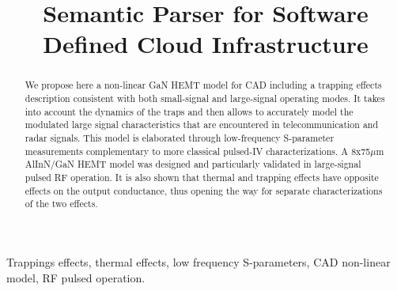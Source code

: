\documentclass[conference]{IEEEtran}
\begin{document}
\title{\LARGE Semantic Parser for Software Defined Cloud Infrastructure}


 \author{
 }

\maketitle

\begin{abstract}
We propose here a non-linear GaN HEMT model for CAD including a trapping effects description consistent with both small-signal and large-signal operating modes. It takes into account the dynamics of the traps and then allows to accurately model the modulated large signal characteristics that are encountered in telecommunication and radar signals. This model is elaborated through low-frequency S-parameter measurements complementary to more classical pulsed-IV characterizations. A 8x75$\mu$m AlInN/GaN HEMT model was designed and particularly validated in large-signal pulsed RF operation. It is also shown that thermal and trapping effects have opposite effects on the output conductance, thus opening the way for separate characterizations of the two effects.
\end{abstract}

\IEEEoverridecommandlockouts
\begin{keywords}
Trappings effects, thermal effects, low frequency S-parameters, CAD non-linear model, RF pulsed operation.
\end{keywords}

\IEEEpeerreviewmaketitle


\end{document}
